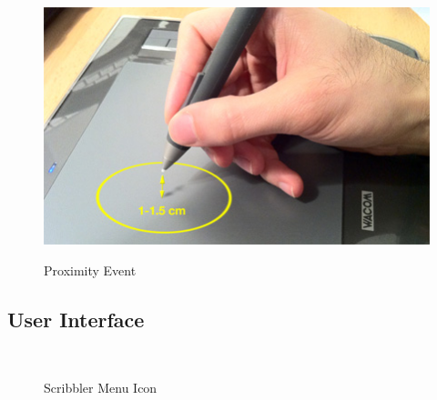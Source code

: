 \begin{figure}
        {\includegraphics[width=1\linewidth]{gfx/scribblerProximity}}
		\caption[Proximity Event]{Proximity Event}\label{fig:scribblerProximity}
\end{figure}

\subsection{User Interface}

\begin{figure}
	\begin{center}
        \myfloatalign
         \quad
         \quad
		 \\
        \caption[Scribbler Menu Icon]{Scribbler Menu Icon}\label{fig:scribblerMenuIcon}
	\end{center}
\end{figure}

